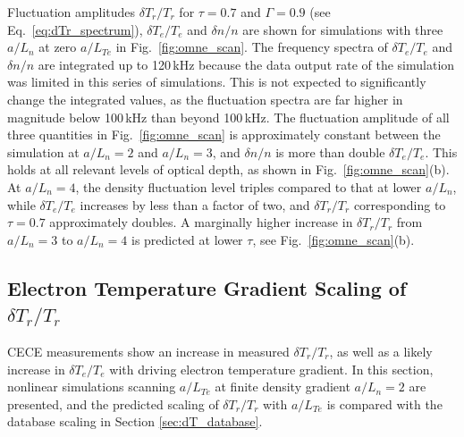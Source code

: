 \documentclass[%
 aip,
 amsmath,amssymb,
 reprint,%
]{revtex4-1}
\begin{document}
Fluctuation amplitudes $\delta T_r/T_r$  for $\tau=0.7$ and $\Gamma=0.9$ (see Eq.\ \eqref{eq:dTr_spectrum}), $\delta T_e/T_e$  and $\delta n/n$ are shown for simulations with three $a/L_n$ at zero $a/L_{Te}$ in Fig.\ \ref{fig:omne_scan}. The frequency spectra of $\delta T_e/T_e$  and $\delta n/n$ are integrated up to 120\,kHz because the data output rate of the simulation was limited in this series of simulations. This is not expected to significantly change the integrated values, as the fluctuation spectra are far higher in magnitude below 100\,kHz than beyond 100\,kHz. The fluctuation amplitude of all three quantities in Fig.\ \ref{fig:omne_scan} is approximately constant between the simulation at $a/L_n=2$ and $a/L_n=3$, and $\delta n/n$ is more than double $\delta T_e/T_e$. This holds at all relevant levels of optical depth, as shown in Fig.\ \ref{fig:omne_scan}(b). At $a/L_n=4$, the density fluctuation level triples compared to that at lower $a/L_n$, while $\delta T_e/T_e$  increases by less than a factor of two, and $\delta T_r/T_r$  corresponding to $\tau=0.7$ approximately doubles. A marginally higher increase in $\delta T_r/T_r$  from $a/L_n=3$ to $a/L_n=4$ is predicted at lower $\tau$, see Fig.\ \ref{fig:omne_scan}(b).


\subsection{Electron Temperature Gradient Scaling of $\delta T_r/T_r$ } \label{sec:gk_omt_scan}
CECE measurements show an increase in measured $\delta T_r/T_r$, as well as a likely increase in $\delta T_e/T_e$ with driving electron temperature gradient. In this section, nonlinear simulations scanning $a/L_{Te}$ at finite density gradient $a/L_n=2$ are presented, and the predicted scaling of $\delta T_r/T_r$  with $a/L_{Te}$ is compared with the database scaling in Section \ref{sec:dT_database}.
\end{document}

